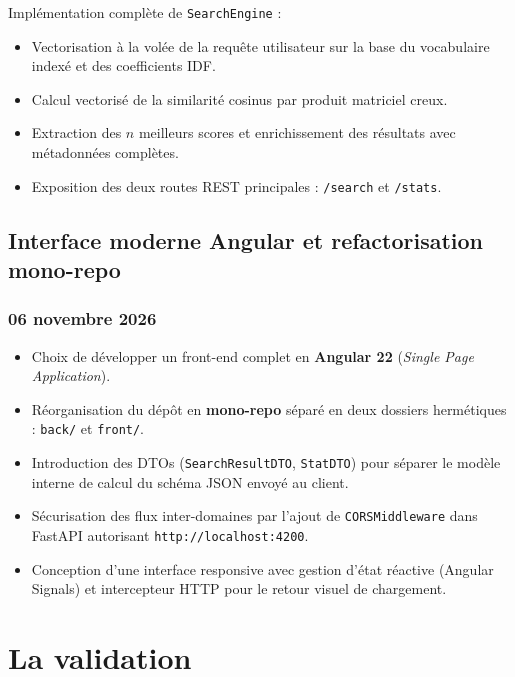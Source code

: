 \documentclass[12pt,a4paper]{article}
\begin{document}
Implémentation complète de \texttt{SearchEngine} :
\begin{itemize}
	\item Vectorisation à la volée de la requête utilisateur sur la base du vocabulaire indexé et des coefficients IDF.
	\item Calcul vectorisé de la similarité cosinus par produit matriciel creux.
	\item Extraction des $n$ meilleurs scores et enrichissement des résultats avec métadonnées complètes.
\end{itemize}

\begin{itemize}
	\item Exposition des deux routes REST principales : \texttt{/search} et \texttt{/stats}.
\end{itemize}



\newpage

\subsection{Interface moderne Angular et refactorisation mono-repo}

\subsubsection{06 novembre 2026}
\begin{itemize}
    \item Choix de développer un front-end complet en \textbf{Angular 22} (\textit{Single Page Application}).
    \item Réorganisation du dépôt en \textbf{mono-repo} séparé en deux dossiers hermétiques : \texttt{back/} et \texttt{front/}.
    \item Introduction des DTOs (\texttt{SearchResultDTO}, \texttt{StatDTO}) pour séparer le modèle interne de calcul du schéma JSON envoyé au client.
    \item Sécurisation des flux inter-domaines par l'ajout de \texttt{CORSMiddleware} dans FastAPI autorisant \texttt{http://localhost:4200}.
    \item Conception d'une interface responsive avec gestion d'état réactive (Angular Signals) et intercepteur HTTP pour le retour visuel de chargement.
\end{itemize}

\newpage

\section{La validation}
\end{document}
